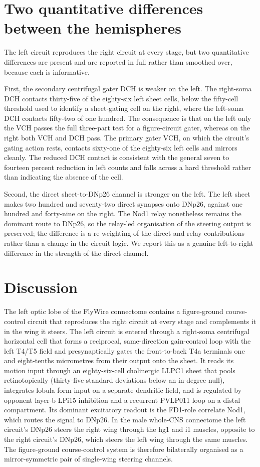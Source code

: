 \documentclass[11pt]{article}
\begin{document}
\section{Two quantitative differences between the hemispheres}

The left circuit reproduces the right circuit at every stage, but two quantitative differences
are present and are reported in full rather than smoothed over, because each is informative.

First, the secondary centrifugal gater DCH is weaker on the left. The right-soma DCH contacts
thirty-five of the eighty-six left sheet cells, below the fifty-cell threshold used to identify a
sheet-gating cell on the right, where the left-soma DCH contacts fifty-two of one hundred. The
consequence is that on the left only the VCH passes the full three-part test for a figure-circuit
gater, whereas on the right both VCH and DCH pass. The primary gater VCH, on which the circuit's
gating action rests, contacts sixty-one of the eighty-six left cells and mirrors cleanly. The
reduced DCH contact is consistent with the general seven to fourteen percent reduction in left
counts and falls across a hard threshold rather than indicating the absence of the cell.

Second, the direct sheet-to-DNp26 channel is stronger on the left. The left sheet makes two
hundred and seventy-two direct synapses onto DNp26, against one hundred and forty-nine on the
right. The Nod1 relay nonetheless remains the dominant route to DNp26, so the relay-led
organisation of the steering output is preserved; the difference is a re-weighting of the direct
and relay contributions rather than a change in the circuit logic. We report this as a genuine
left-to-right difference in the strength of the direct channel.

\section{Discussion}

The left optic lobe of the FlyWire connectome contains a figure-ground course-control circuit
that reproduces the right circuit at every stage and complements it in the wing it steers. The
left circuit is entered through a right-soma centrifugal horizontal cell that forms a reciprocal,
same-direction gain-control loop with the left T4/T5 field and presynaptically gates the
front-to-back T4a terminals one and eight-tenths micrometres from their output onto the sheet. It
reads its motion input through an eighty-six-cell cholinergic LLPC1 sheet that pools
retinotopically (thirty-five standard deviations below an in-degree null), integrates lobula form
input on a separate dendritic field, and is regulated by opponent layer-b LPi15 inhibition and a
recurrent PVLP011 loop on a distal compartment. Its dominant excitatory readout is the FD1-role
correlate Nod1, which routes the signal to DNp26. In the male whole-CNS connectome the left
circuit's DNp26 steers the right wing through the hg1 and i1 muscles, opposite to the right
circuit's DNp26, which steers the left wing through the same muscles. The figure-ground
course-control system is therefore bilaterally organised as a mirror-symmetric pair of
single-wing steering channels.
\end{document}

